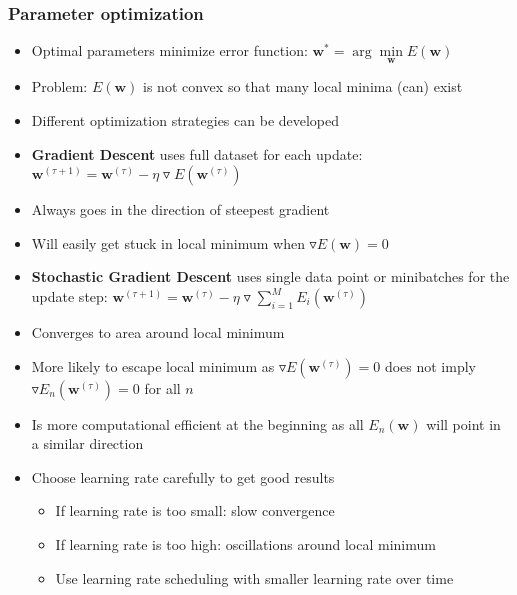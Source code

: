 \subsubsection{Parameter optimization}
\begin{itemize}
	\item Optimal parameters minimize error function: $\bm{w}^{*} = \arg\min\limits_{\bm{w}} E(\bm{w})$
	\item Problem: $E(\bm{w})$ is not convex so that many local minima (can) exist 
	\item Different optimization strategies can be developed
	\item \textbf{Gradient Descent} uses full dataset for each update: $\bm{w}^{(\tau + 1)} = \bm{w}^{(\tau)} - \eta \triangledown E\left(\bm{w}^{(\tau)}\right)$
	\item Always goes in the direction of steepest gradient
	\item Will easily get stuck in local minimum when $\triangledown E\left(\bm{w}\right) = 0$
	\item \textbf{Stochastic Gradient Descent} uses single data point or minibatches for the update step: $\bm{w}^{(\tau + 1)} = \bm{w}^{(\tau)} - \eta \triangledown\sum\limits_{i=1}^{M} E_i\left(\bm{w}^{(\tau)}\right)$ 
	\item Converges to area around local minimum
	\item More likely to escape local minimum as $\triangledown E\left(\bm{w}^{(\tau)}\right) = 0$ does not imply $\triangledown E_n\left(\bm{w}^{(\tau)}\right) = 0$ for all $n$
	\item Is more computational efficient at the beginning as all $E_n\left(\bm{w}\right)$ will point in a similar direction
	\item Choose learning rate carefully to get good results
	\begin{itemize}
		\item If learning rate is too small: slow convergence
		\item If learning rate is too high: oscillations around local minimum
		\item Use learning rate scheduling with smaller learning rate over time
	\end{itemize}
\end{itemize}
